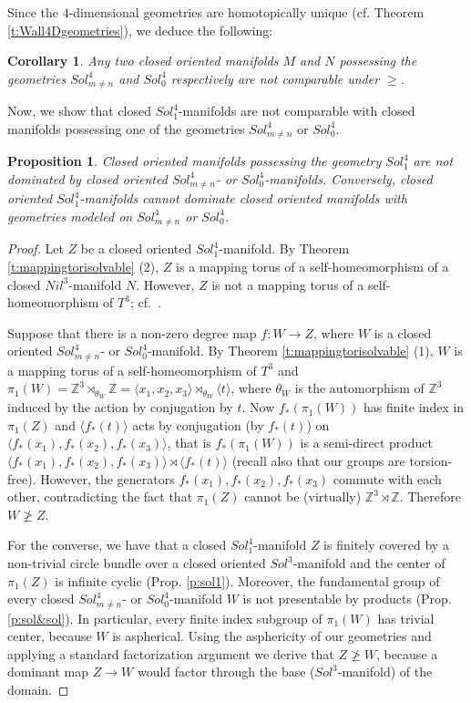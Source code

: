 \documentclass[12pt]{amsart}
\newtheorem{prop}[thm]{Proposition}
\newtheorem{cor}[thm]{Corollary}
\theoremstyle{remark}
\begin{document}
Since the $4$-dimensional geometries are homotopically unique (cf. Theorem \ref{t:Wall4Dgeometries}), we deduce the following:

\begin{cor}\label{c:nonmapsbetweensol}
 Any two closed oriented manifolds $M$ and $N$ possessing the geometries $Sol_{m \neq n}^4$ and $Sol_0^4$ respectively are not comparable under
$\geq$.
\end{cor}

Now, we show that closed $Sol_1^4$-manifolds are not comparable with closed manifolds possessing one of the geometries $Sol_{m \neq n}^4$ or $Sol_0^4$.

\begin{prop}
 Closed oriented manifolds possessing the geometry $Sol_1^4$ are not dominated by closed oriented $Sol_{m \neq n}^4$- or $Sol_0^4$-manifolds. Conversely,
closed oriented $Sol_1^4$-manifolds cannot dominate closed oriented manifolds with geometries modeled on $Sol_{m \neq n}^4$ or $Sol_0^4$.
\end{prop}
\begin{proof}
  Let $Z$ be a closed oriented $Sol_1^4$-manifold. By Theorem \ref{t:mappingtorisolvable} (2), $Z$ is a mapping torus of a self-homeomorphism of
a closed $Nil^3$-manifold $N$. However, $Z$ is not a mapping torus of a self-homeomorphism of $T^3$; cf.~\cite[Section 8.6]{Hillman}.

Suppose that there is a non-zero degree map $f \colon W \longrightarrow Z$, where $W$ is a closed oriented $Sol_{m \neq n}^4$- or $Sol_0^4$-manifold.
By Theorem \ref{t:mappingtorisolvable} (1), $W$ is a mapping torus of a
self-homeomorphism of $T^3$ and $\pi_1(W) = {\mathbb{Z}}^3 \rtimes_{\theta_W} {\mathbb{Z}} = \langle x_1,x_2,x_3 \rangle \rtimes_{\theta_W} \langle t  \rangle$, where
$\theta_W$ is the automorphism of ${\mathbb{Z}}^3$ induced by the action by conjugation by $t$. Now $f_*(\pi_1(W))$ has finite index in $\pi_1(Z)$ and $\langle
f_*(t) \rangle$ acts
by conjugation (by $f_*(t)$) on $\langle f_*(x_1),f_*(x_2),f_*(x_3) \rangle$, that is $f_*(\pi_1(W))$ is a semi-direct product
$\langle f_*(x_1),f_*(x_2),f_*(x_3) \rangle \rtimes \langle f_*(t) \rangle$ (recall also that our groups are torsion-free).
However, the generators
$f_*(x_1),f_*(x_2),f_*(x_3)$ commute with each other, contradicting the fact that $\pi_1(Z)$ cannot be (virtually) ${\mathbb{Z}}^3 \rtimes {\mathbb{Z}}$. Therefore $W \ngeq
Z$.

For the converse, we have that a closed $Sol_1^4$-manifold $Z$ is finitely covered by a non-trivial circle bundle
over a closed oriented $Sol^3$-manifold and the center of $\pi_1(Z)$ is infinite cyclic (Prop. \ref{p:sol1}). Moreover, the fundamental group of every closed $Sol_{m \neq n}^4$- or $Sol_0^4$-manifold $W$ is not
presentable by products (Prop. \ref{p:sol&sol}). In particular, every finite index subgroup of $\pi_1(W)$ has trivial
center, because $W$ is aspherical. Using the asphericity of our geometries and applying a standard factorization argument we derive that $Z \ngeq W$,
because a dominant map $Z \longrightarrow W$ would factor through the base ($Sol^3$-manifold) of the domain.
\end{proof}
\end{document}
